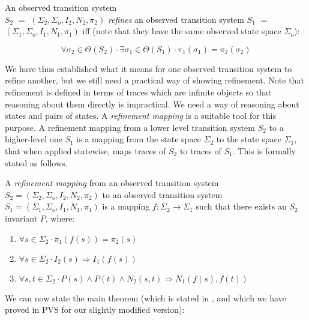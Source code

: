 \begin{definition}[Refinement]
\label{def-refinement}
An observed transition system\\ 
  $S_2$ $=$ $(\Sigma_2,\Sigma_o,I_2,N_2,\pi_2)$ 
{\em refines} an observed transition system   
  $S_1$ $=$ $(\Sigma_1,\Sigma_o,I_1,N_1,\pi_1)$ 
iff (note that they have the same observed state space $\Sigma_o$):

\[
  \forall \sigma_2 \in \Theta(S_2) \cdot 
    \exists \sigma_1 \in \Theta(S_1) \cdot
      \pi_1(\sigma_1) = \pi_2(\sigma_2)
\]
\end{definition}

\noindent
We have thus established  what it means for one  observed transition
system to refine another, but we still need  a  practical way of
showing refinement.  Note  that 
refinement is defined in terms of traces which are infinite objects
so that reasoning about them directly is impractical.  We need a way  of
reasoning  about states and pairs of states. A {\em refinement mapping} is
a suitable tool for this purpose.  A 
refinement  mapping from  a  lower  level  transition system $S_2$ to   a
higher-level  one $S_1$ is    a mapping from the state space  $\Sigma_2$ to
the  state space $\Sigma_1$, that when applied statewise, 
maps traces of $S_2$ to traces of $S_1$.  This is formally stated as
follows.

\begin{definition}
\label{def-refinement-mapping}
A {\em refinement mapping} from an observed transition system
  $S_2 = (\Sigma_2,\Sigma_o,I_2,N_2,\pi_2)$
to an observed transition system
  $S_1 = (\Sigma_1,\Sigma_o,I_1,N_1,\pi_1)$
is a mapping $f : \Sigma_2 \rightarrow \Sigma_1$ such that there exists an
$S_2$ invariant $P$,  where:

\begin{enumerate}

 \item $\forall s \in \Sigma_2 \cdot \pi_1(f(s)) = \pi_2(s)$

 \item $\forall s \in \Sigma_2 \cdot I_2(s) \Rightarrow I_1(f(s))$

 \item $\forall s,t \in \Sigma_2 \cdot 
          P(s) \wedge P(t) \wedge N_2(s,t) \Rightarrow N_1(f(s),f(t))$ 
       
\end{enumerate}
\end{definition}

\noindent
We   can now    state   the  main   theorem   (which  is   stated   in
\cite{AL:Mappings}, and which we have proved in  PVS for our slightly
modified version):

